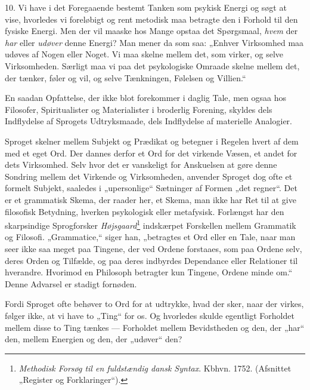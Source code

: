 \documentclass[12pt,a4paper]{book}
\newcommand{\apage}[1]{\marginnote{\footnotesize\textit{[#1]}}}
\begin{document}
10. Vi have i det Foregaaende bestemt Tanken som psykisk Energi og søgt
at vise, hvorledes vi foreløbigt og rent metodisk maa betragte den i
Forhold til den fysiske Energi. Men der vil maaske hos Mange opstaa det
Spørgsmaal, \emph{hvem} der \emph{har} eller \emph{udøver} denne
Energi? Man mener da som saa: „Enhver Virksomhed maa udøves af Nogen
eller Noget. Vi maa skelne mellem det, som virker, og selve
Virksomheden. Særligt maa vi paa det psykologiske Omraade skelne mellem
det, der tænker, føler og vil, og selve Tænkningen, Følelsen og
Villien.“

En saadan Opfattelse, der ikke blot forekommer i daglig Tale, men
ogsaa hos Filosofer, Spiritualister og Materialister i broderlig
Forening, skyldes dels Indflydelse af Sprogets Udtryksmaade, dels
Indflydelse af materielle Analogier.

Sproget skelner mellem Subjekt og Prædikat og betegner i Regelen hvert
af dem med et eget Ord. Der dannes derfor et Ord for det virkende
Væsen, et andet for dets Virksomhed. Selv hvor det er vanskeligt for
Anskuelsen at gøre denne Sondring mellem det Virkende og Virksomheden,
anvender Sproget dog ofte et formelt Subjekt, saaledes i „upersonlige“
Sætninger af Formen „det regner“. Det er et grammatisk Skema, der
raader her, et Skema, man ikke har Ret til at give filosofisk Betydning,
hverken psykologisk eller metafysisk. Forlængst har den skarpsindige
Sprogforsker \emph{Højsgaard}\footnote{\emph{Methodisk Forsøg til en
fuldstændig dansk Syntax}. Kbhvn. 1752. (Afsnittet „Register og
Forklaringer“).} indskærpet Forskellen mellem Grammatik og Filosofi.
„Grammatice,“ siger han, „betragtes et Ord eller en Tale, naar man
seer ikke saa meget paa Tingene, der ved Ordene forstaaes, som paa
Ordene selv, deres Orden og Tilfælde, og paa deres indbyrdes
Dependance eller Relationer til hverandre. Hvorimod en Philosoph
betragter kun Tingene, Ordene minde om.“ Denne Advarsel er stadigt
fornøden.

\apage{35} Fordi Sproget ofte behøver to Ord for at udtrykke, hvad der sker, naar
der virkes, følger ikke, at vi have to „Ting“ for os. Og hvorledes
skulde egentligt Forholdet mellem disse to Ting tænkes --- Forholdet
mellem Bevidstheden og den, der „har“ den, mellem Energien og den, der
„udøver“ den?
\end{document}
